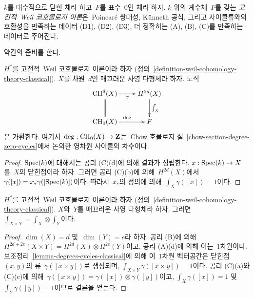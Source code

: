 \begin{definition}
\label{definition-weil-cohomology-theory-classical}
$k$를 대수적으로 닫힌 체라 하고\  $F$를 표수\  $0$인 체라 하자.
$k$ 위의 계수체\  $F$를 갖는 {\it 고전적\  Weil 코호몰로지 이론}은\ 
Poincar\'e 쌍대성, K\"unneth 공식, 그리고 사이클류와의 호환성을
만족하는 데이터 (D1), (D2), (D3), 더 정확히는 (A), (B), (C)를
만족하는 데이터로 주어진다.
\end{definition}

\noindent
약간의 준비를 한다.

\begin{lemma}
\label{lemma-degrees-cycles-classical}
$H^*$를 고전적\  Weil 코호몰로지 이론이라 하자
(정의\  \ref{definition-weil-cohomology-theory-classical}).
$X$를 차원\  $d$인 매끄러운 사영 다형체라 하자. 도식
$$
\xymatrix{
\CH^d(X) \ar[r]_-\gamma \ar@{=}[d] &
H^{2d}(X) \ar[d]^{\int_X} \\
\CH_0(X) \ar[r]^\deg & F
}
$$
은 가환한다. 여기서\  $\deg : \mathop{\mathrm{CH}}\nolimits_0(X) \to \mathbf{Z}$는\ 
Chow 호몰로지 절\  \ref{chow-section-degree-zero-cycles}에서 논의한
영차원 사이클의 차수이다.
\end{lemma}

\begin{proof}
$\mathop{\mathrm{Spec}}(k)$에 대해서는 공리 (C)(d)에 의해 결과가 성립한다.
$x : \mathop{\mathrm{Spec}}(k) \to X$를\  $X$의 닫힌점이라 하자. 그러면 공리 (C)(b)에
의해\  $H^{2d}(X)$에서\ 
$\gamma([x]) = x_*\gamma([\mathop{\mathrm{Spec}}(k)])$이다. 따라서\  $x_*$의 정의에 의해\ 
$\int_X \gamma([x]) = 1$이다.
\end{proof}

\begin{lemma}
\label{lemma-trace-product-classical}
$H^*$를 고전적\  Weil 코호몰로지 이론이라 하자
(정의\  \ref{definition-weil-cohomology-theory-classical}).
$X$와\  $Y$를 매끄러운 사영 다형체라 하자. 그러면\ 
$\int_{X \times Y} = \int_X \otimes \int_Y$이다.
\end{lemma}

\begin{proof}
$\dim(X) = d$ 및\  $\dim(Y) = e$라 하자. 공리 (B)에 의해\ 
$H^{2d + 2e}(X \times Y) = H^{2d}(X) \otimes H^{2e}(Y)$이고,
공리 (A)(d)에 의해 이는\  $1$차원이다. 보조정리\ 
\ref{lemma-degrees-cycles-classical}에 의해 이\  $1$차원 벡터공간은
닫힌점\  $(x, y)$의 류\  $\gamma([x \times y])$로 생성되며,
$\int_{X \times Y} \gamma([x \times y]) = 1$이다.
공리 (C)(a)와 (C)(c)에 의해\ 
$\gamma([x \times y]) = \gamma([x]) \otimes \gamma([y])$이고,
$\int_X \gamma([x]) = 1$ 및\  $\int_Y \gamma([y]) = 1$이므로 결론을 얻는다.
\end{proof}

